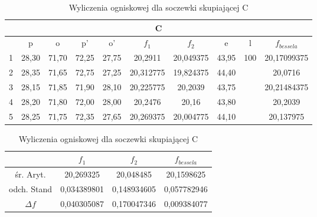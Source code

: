 \documentclass{article}
\begin{document}
\begin{table}[!ht]
    \centering
    \begin{tabular}{|c|c|c|c|c|c|c|c|c|c|}
    \hline
        \multicolumn{10}{|c|}{C} \\ \hline
         & p & o & p' & o' & $f_1$ & $f_2$ & e & l & $f_{bessela}$ \\ \hline
        1 & 28,30 & 71,70 & 72,25 & 27,75 & 20,2911 & 20,049375 & 43,95 & \multirow{5}{*}{100} & 20,17099375 \\ \cline{1-8} \cline{10-10}
        2 & 28,35 & 71,65 & 72,75 & 27,25 & 20,312775 & 19,824375 & 44,40 &  & 20,0716 \\ \cline{1-8} \cline{10-10}
        3 & 28,15 & 71,85 & 71,90 & 28,10 & 20,225775 & 20,2039 & 43,75 &  & 20,21484375 \\ \cline{1-8} \cline{10-10}
        4 & 28,20 & 71,80 & 72,00 & 28,00 & 20,2476 & 20,16 & 43,80 &  & 20,2039 \\ \cline{1-8} \cline{10-10}
        5 & 28,25 & 71,75 & 72,35 & 27,65 & 20,269375 & 20,004775 & 44,10 &  & 20,137975 \\ \hline
    \end{tabular}

    \begin{tabular}{|c|c|c|c|}
    \hline
            &$f_1$ & $f_2$ & $f_{bessela}$ \\ \hline
        śr. Aryt. & 20,269325 & 20,048485 & 20,1598625 \\ \hline
        odch. Stand & 0,034389801 & 0,148934605 & 0,057782946 \\ \hline
        $\Delta f$ & 0,040305087 & 0,170047346 & 0,009384077 \\ \hline
    \end{tabular}
       \caption{Wyliczenia ogniskowej dla soczewki skupiającej C}
    \label{tab:Wyl_3}
\end{table}
\end{document}
